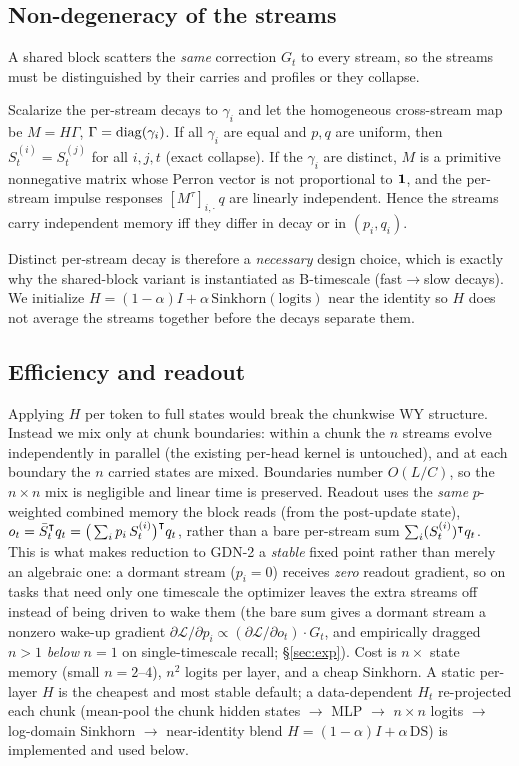 \documentclass[11pt,letterpaper,logo]{yalearxiv}
\begin{document}
\subsection{Non-degeneracy of the streams}
A shared block scatters the \emph{same} correction $G_t$ to every stream, so the streams
must be distinguished by their carries and profiles or they collapse.

\begin{proposition}
\label{prop:collapse}
Scalarize the per-stream decays to $\gamma_i$ and let the homogeneous cross-stream map be
$M = H\Gamma$, $\Gamma = \operatorname{diag}(\gamma_i)$. If all $\gamma_i$ are equal and $p,q$ are
uniform, then $S_t^{(i)} = S_t^{(j)}$ for all $i,j,t$ (exact collapse). If the $\gamma_i$
are distinct, $M$ is a primitive nonnegative matrix whose Perron vector is not proportional
to $\mathbf 1$, and the per-stream impulse responses $[M^\tau]_{i,\cdot}\,q$ are linearly
independent. Hence the streams carry independent memory iff they differ in decay or in
$(p_i,q_i)$.
\end{proposition}

Distinct per-stream decay is therefore a \emph{necessary} design choice, which is exactly
why the shared-block variant is instantiated as B-timescale (fast$\to$slow decays). We
initialize $H = (1-\alpha)I + \alpha\,\mathrm{Sinkhorn}(\text{logits})$ near the identity so
$H$ does not average the streams together before the decays separate them.

\subsection{Efficiency and readout}
Applying $H$ per token to full states would break the chunkwise WY structure. Instead we mix
only at chunk boundaries: within a chunk the $n$ streams evolve independently in parallel
(the existing per-head kernel is untouched), and at each boundary the $n$ carried states are
mixed. Boundaries number $O(L/C)$, so the $n\times n$ mix is negligible and linear time is
preserved. Readout uses the \emph{same} $p$-weighted combined memory the block reads
(from the post-update state), $o_t = \bar S_t^{\intercal} q_t = \big(\sum_i p_i\, S_t^{(i)}\big)^{\intercal} q_t$,
rather than a bare per-stream sum $\sum_i (S_t^{(i)})^{\intercal} q_t$. This is what makes
reduction to GDN-2 a \emph{stable} fixed point rather than merely an algebraic one: a
dormant stream ($p_i=0$) receives \emph{zero} readout gradient, so on tasks that need only
one timescale the optimizer leaves the extra streams off instead of being driven to wake
them (the bare sum gives a dormant stream a nonzero wake-up gradient $\partial \mathcal
L/\partial p_i \propto (\partial \mathcal L/\partial o_t)\cdot G_t$, and empirically dragged
$n>1$ \emph{below} $n=1$ on single-timescale recall; \S\ref{sec:exp}).
Cost is $n\times$ state memory (small $n=2\text{--}4$), $n^2$ logits per layer, and a cheap
Sinkhorn. A static per-layer $H$ is the cheapest and most stable default; a data-dependent
$H_t$ re-projected each chunk (mean-pool the chunk hidden states $\to$ MLP $\to$ $n{\times}n$
logits $\to$ log-domain Sinkhorn $\to$ near-identity blend $H=(1-\alpha)I+\alpha\,\mathrm{DS}$)
is implemented and used below.
\end{document}
